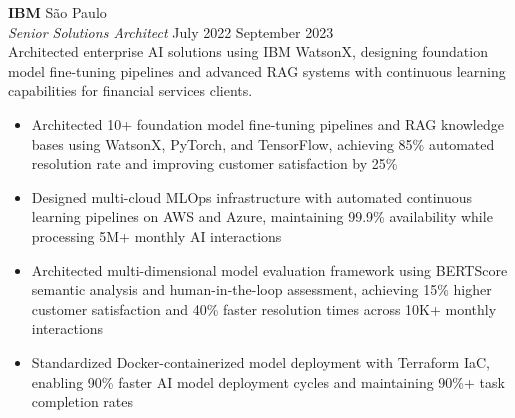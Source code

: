 \documentclass[a4paper]{article}
\begin{document}
\textbf{IBM}                                                      \hfill São Paulo              \\
\textit{Senior Solutions Architect}                               \hfill July 2022 \raisebox{0.2ex}{\scalebox{0.8}{$\sim$}} September 2023    \\
\vspace{0.5mm}
Architected enterprise AI solutions using IBM WatsonX, designing foundation model fine-tuning pipelines and advanced RAG systems with continuous learning capabilities for financial services clients.
\vspace{-2mm}
\begin{itemize}
\setlength\itemsep{-1mm}
\item Architected 10+ foundation model fine-tuning pipelines and RAG knowledge bases using WatsonX, PyTorch, and TensorFlow, achieving 85\% automated resolution rate and improving customer satisfaction by 25\%
\item Designed multi-cloud MLOps infrastructure with automated continuous learning pipelines on AWS and Azure, maintaining 99.9\% availability while processing 5M+ monthly AI interactions
\item Architected multi-dimensional model evaluation framework using BERTScore semantic analysis and human-in-the-loop assessment, achieving 15\% higher customer satisfaction and 40\% faster resolution times across 10K+ monthly interactions
\item Standardized Docker-containerized model deployment with Terraform IaC, enabling 90\% faster AI model deployment cycles and maintaining 90\%+ task completion rates
\end{itemize}
\end{document}

